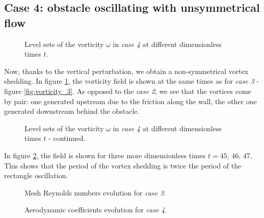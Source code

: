 \documentclass[11 pt]{article}
\begin{document}

\subsection{Case 4: obstacle oscillating with unsymmetrical flow}

\begin{figure}[H]
    \centering
    
    \caption{Level sets of the vorticity $\omega$ in \textit{case 4} at different dimensionless times $t$.}
    \label{fig:vorticity_4a}
\end{figure}

Now, thanks to the vertical perturbation, we obtain a non-symmetrical vortex shedding. In figure \ref{fig:vorticity_4a}, the vorticity field is shown at the same times as for \textit{case 3} - figure \ref{fig:vorticity_3}. As opposed to the \textit{case 2}, we see that the vortices come by pair: one generated upstream due to the friction along the wall, the other one generated downstream behind the obstacle. 

\begin{figure}[H]
    \centering
    
    \caption{Level sets of the vorticity $\omega$ in \textit{case 4} at different dimensionless times $t$ - continued.}
    \label{fig:vorticity_4b}
\end{figure}

In figure \ref{fig:vorticity_4b}, the field is shown for three more dimensionless times $t=45,\, 46,\, 47$. This shows that the period of the vortex shedding is twice the period of the rectangle oscillation.

\begin{figure}[H]
    \centering
    
    \caption{Mesh Reynolds numbers evolution for \textit{case 3}.}
    \label{fig:mesh_re_case4}
\end{figure}

\begin{figure}[H]
    \centering
    
    \caption{Aerodynamic coefficients evolution for \textit{case 4}.}
    \label{fig:drag_case4}
\end{figure}

%     
\end{document}
